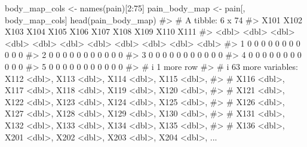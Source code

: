 \documentclass[
  letterpaper,
]{krantz}
\makeatletter
\newenvironment{Shaded}{\begin{snugshade}}{\end{snugshade}}
\newcommand{\CommentTok}[1]{\textcolor[rgb]{0.37,0.37,0.37}{#1}}
\newcommand{\DecValTok}[1]{\textcolor[rgb]{0.68,0.00,0.00}{#1}}
\newcommand{\FunctionTok}[1]{\textcolor[rgb]{0.28,0.35,0.67}{#1}}
\newcommand{\NormalTok}[1]{\textcolor[rgb]{0.00,0.23,0.31}{#1}}
\newcommand{\OtherTok}[1]{\textcolor[rgb]{0.00,0.23,0.31}{#1}}
\newcommand{\SpecialCharTok}[1]{\textcolor[rgb]{0.37,0.37,0.37}{#1}}
\newenvironment{kframe}{%
\medskip{}
\setlength{\fboxsep}{.8em}
 \def\at@end@of@kframe{}%
 \ifinner\ifhmode%
  \def\at@end@of@kframe{\end{minipage}}%
  \begin{minipage}{\columnwidth}%
 \fi\fi%
 \def\FrameCommand##1{\hskip\@totalleftmargin \hskip-\fboxsep
 \colorbox{shadecolor}{##1}\hskip-\fboxsep
     \hskip-\linewidth \hskip-\@totalleftmargin \hskip\columnwidth}%
 \MakeFramed {\advance\hsize-\width
   \@totalleftmargin\z@ \linewidth\hsize
   \@setminipage}}%
 {\par\unskip\endMakeFramed%
 \at@end@of@kframe}
\renewenvironment{Shaded}{\begin{kframe}}{\end{kframe}}
\makeatother
\begin{document}
\begin{Shaded}
\begin{Highlighting}[]
\NormalTok{body\_map\_cols }\OtherTok{\textless{}{-}} \FunctionTok{names}\NormalTok{(pain)[}\DecValTok{2}\SpecialCharTok{:}\DecValTok{75}\NormalTok{]}
\NormalTok{pain\_body\_map }\OtherTok{\textless{}{-}}\NormalTok{ pain[, body\_map\_cols]}
\FunctionTok{head}\NormalTok{(pain\_body\_map)}
\CommentTok{\#\textgreater{} \# A tibble: 6 x 74}
\CommentTok{\#\textgreater{}    X101  X102  X103  X104  X105  X106  X107  X108  X109  X110  X111}
\CommentTok{\#\textgreater{}   \textless{}dbl\textgreater{} \textless{}dbl\textgreater{} \textless{}dbl\textgreater{} \textless{}dbl\textgreater{} \textless{}dbl\textgreater{} \textless{}dbl\textgreater{} \textless{}dbl\textgreater{} \textless{}dbl\textgreater{} \textless{}dbl\textgreater{} \textless{}dbl\textgreater{} \textless{}dbl\textgreater{}}
\CommentTok{\#\textgreater{} 1     0     0     0     0     0     0     0     0     0     0     0}
\CommentTok{\#\textgreater{} 2     0     0     0     0     0     0     0     0     0     0     0}
\CommentTok{\#\textgreater{} 3     0     0     0     0     0     0     0     0     0     0     0}
\CommentTok{\#\textgreater{} 4     0     0     0     0     0     0     0     0     0     0     0}
\CommentTok{\#\textgreater{} 5     0     0     0     0     0     0     0     0     0     0     0}
\CommentTok{\#\textgreater{} \# i 1 more row}
\CommentTok{\#\textgreater{} \# i 63 more variables: X112 \textless{}dbl\textgreater{}, X113 \textless{}dbl\textgreater{}, X114 \textless{}dbl\textgreater{}, X115 \textless{}dbl\textgreater{},}
\CommentTok{\#\textgreater{} \#   X116 \textless{}dbl\textgreater{}, X117 \textless{}dbl\textgreater{}, X118 \textless{}dbl\textgreater{}, X119 \textless{}dbl\textgreater{}, X120 \textless{}dbl\textgreater{},}
\CommentTok{\#\textgreater{} \#   X121 \textless{}dbl\textgreater{}, X122 \textless{}dbl\textgreater{}, X123 \textless{}dbl\textgreater{}, X124 \textless{}dbl\textgreater{}, X125 \textless{}dbl\textgreater{},}
\CommentTok{\#\textgreater{} \#   X126 \textless{}dbl\textgreater{}, X127 \textless{}dbl\textgreater{}, X128 \textless{}dbl\textgreater{}, X129 \textless{}dbl\textgreater{}, X130 \textless{}dbl\textgreater{},}
\CommentTok{\#\textgreater{} \#   X131 \textless{}dbl\textgreater{}, X132 \textless{}dbl\textgreater{}, X133 \textless{}dbl\textgreater{}, X134 \textless{}dbl\textgreater{}, X135 \textless{}dbl\textgreater{},}
\CommentTok{\#\textgreater{} \#   X136 \textless{}dbl\textgreater{}, X201 \textless{}dbl\textgreater{}, X202 \textless{}dbl\textgreater{}, X203 \textless{}dbl\textgreater{}, X204 \textless{}dbl\textgreater{}, ...}
\end{Highlighting}
\end{Shaded}
\end{document}
